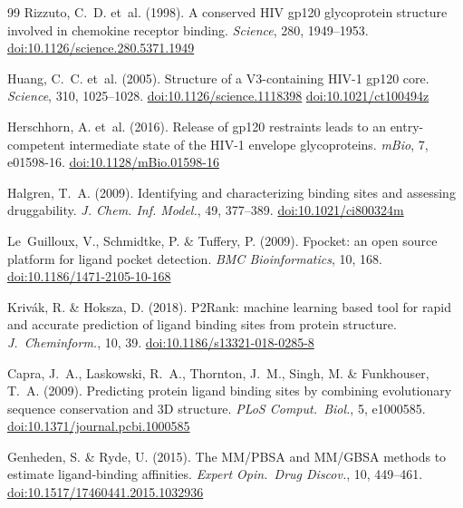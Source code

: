 \documentclass[11pt,a4paper]{article}
\begin{document}
\begin{thebibliography}{99}
Rizzuto, C.~D. et~al. (1998).
\newblock A conserved HIV gp120 glycoprotein structure involved in chemokine receptor binding.
\newblock \textit{Science}, 280, 1949--1953.
\newblock \href{https://doi.org/10.1126/science.280.5371.1949}{doi:10.1126/science.280.5371.1949}

Huang, C.~C. et~al. (2005).
\newblock Structure of a V3-containing HIV-1 gp120 core.
\newblock \textit{Science}, 310, 1025--1028.
\newblock \href{https://doi.org/10.1126/science.1118398}{doi:10.1126/science.1118398}
\newblock \href{https://doi.org/10.1021/ct100494z}{doi:10.1021/ct100494z}

Herschhorn, A. et~al. (2016).
\newblock Release of gp120 restraints leads to an entry-competent intermediate state of the HIV-1 envelope glycoproteins.
\newblock \textit{mBio}, 7, e01598-16.
\newblock \href{https://doi.org/10.1128/mBio.01598-16}{doi:10.1128/mBio.01598-16}

Halgren, T.~A. (2009).
\newblock Identifying and characterizing binding sites and assessing druggability.
\newblock \textit{J. Chem. Inf. Model.}, 49, 377--389.
\newblock \href{https://doi.org/10.1021/ci800324m}{doi:10.1021/ci800324m}

Le~Guilloux, V., Schmidtke, P. \& Tuffery, P. (2009).
\newblock Fpocket: an open source platform for ligand pocket detection.
\newblock \textit{BMC Bioinformatics}, 10, 168.
\newblock \href{https://doi.org/10.1186/1471-2105-10-168}{doi:10.1186/1471-2105-10-168}

Kriv\'ak, R. \& Hoksza, D. (2018).
\newblock P2Rank: machine learning based tool for rapid and accurate prediction of ligand binding sites from protein structure.
\newblock \textit{J.\ Cheminform.}, 10, 39.
\newblock \href{https://doi.org/10.1186/s13321-018-0285-8}{doi:10.1186/s13321-018-0285-8}

Capra, J.~A., Laskowski, R.~A., Thornton, J.~M., Singh, M. \& Funkhouser, T.~A. (2009).
\newblock Predicting protein ligand binding sites by combining evolutionary sequence conservation and 3D structure.
\newblock \textit{PLoS Comput.\ Biol.}, 5, e1000585.
\newblock \href{https://doi.org/10.1371/journal.pcbi.1000585}{doi:10.1371/journal.pcbi.1000585}

Genheden, S. \& Ryde, U. (2015).
\newblock The MM/PBSA and MM/GBSA methods to estimate ligand-binding affinities.
\newblock \textit{Expert Opin.\ Drug Discov.}, 10, 449--461.
\newblock \href{https://doi.org/10.1517/17460441.2015.1032936}{doi:10.1517/17460441.2015.1032936}


\end{thebibliography}
\end{document}
